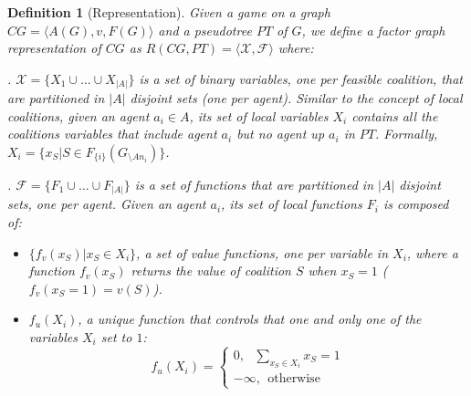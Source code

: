 \documentclass{aamas2012}
\newtheorem{definition}{Definition}
\begin{document}
\begin{definition}[Representation]
\label{def:representation}
 Given a game on a graph $CG=  \langle A(G), v, F(G)\rangle $ and a pseudotree
 $PT$ of $G$, we define a factor graph representation of $CG$ as
 $R(CG,PT)= \langle \mathcal{X}, \mathcal{F} \rangle$ where:

 \vspace{0.1in} \noindent . $\mathcal{X}=\{X_1 \cup \ldots \cup X_{\vert A
 \vert}\}$ is a set of binary variables, one per feasible coalition, that are
 partitioned in $\vert A \vert$ disjoint sets (one per agent). Similar to the concept of local
  coalitions, given an agent $a_i\in A$, its set of local variables $X_i$
  contains all the coalitions variables that include agent $a_i$ but no agent up
  $a_i$ in $PT$. Formally, $X_i = \{x_S\vert S \in F_{\{i\}}(G_{\setminus An_i})
   \}$.

\vspace{0.1in}\noindent .  $\mathcal{F}=\{F_1 \cup \ldots \cup F_{\vert A
\vert}\}$ is a set of functions that are partitioned in $\vert
  A \vert$ disjoint sets, one
per agent. Given an agent $a_i$, its set of local functions $F_i$ is composed
of:
	\begin{itemize}
  		\item $\{f_v(x_S) \vert x_S \in X_i \}$, a set of \emph{value functions},
  		one per variable in $X_i$, where a function $f_v(x_S)$
  		returns the value of coalition $S$ when $x_S=1$ 
  		($f_v(x_S=1)=v(S)$).
  		\item $f_{u}(X_i)$, a \emph{unique function} that controls that one and only
  		one of the variables $X_i$ set to $1$:
  		\begin{equation}
		 f_u(X_i)= 
		 \begin{cases} 
			 0,  \ \ \  \sum_{x_S \in X_i} x_{S} = 1  \\  
			 -\infty,  \ \ \mbox{otherwise}
		 \end{cases}
		 \end{equation}
	 	

\end{itemize}
\end{definition}
\end{document}
